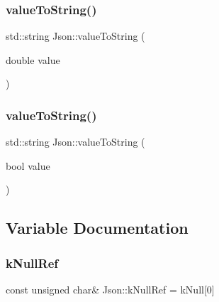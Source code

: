 \mbox{\label{namespace_json_a99995d7dafa4f4970b349d7d3c8d1d99}} 
\subsubsection{\texorpdfstring{value\+To\+String()}{valueToString()}\hspace{0.1cm}{\footnotesize\ttfamily [3/4]}}
{\footnotesize\ttfamily std\+::string Json\+::value\+To\+String (\begin{DoxyParamCaption}\item[{double}]{value }\end{DoxyParamCaption})}

\mbox{\label{namespace_json_a979ed531f091985e22f0051cd2a8e341}} 
\subsubsection{\texorpdfstring{value\+To\+String()}{valueToString()}\hspace{0.1cm}{\footnotesize\ttfamily [4/4]}}
{\footnotesize\ttfamily std\+::string Json\+::value\+To\+String (\begin{DoxyParamCaption}\item[{bool}]{value }\end{DoxyParamCaption})}



\subsection{Variable Documentation}
\mbox{\label{namespace_json_ab30055b4bbd82aecaca57ccecd63bbe6}} 
\subsubsection{\texorpdfstring{k\+Null\+Ref}{kNullRef}}
{\footnotesize\ttfamily const unsigned char\& Json\+::k\+Null\+Ref = k\+Null\mbox{[}0\mbox{]}}

